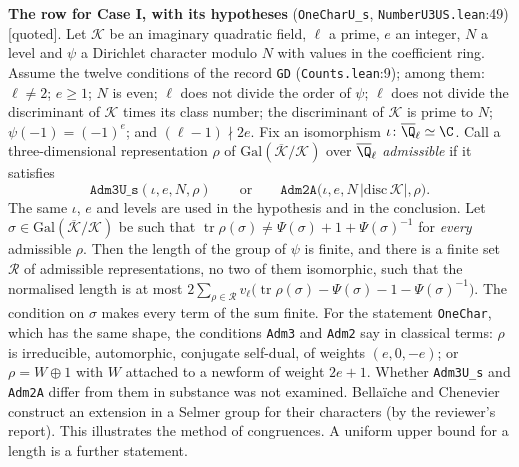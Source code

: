 \documentclass[11pt,letterpaper]{article}
\newcommand{\quoted}{\textsf{[quoted]}}
\begin{document}
\textbf{The row for Case I, with its hypotheses} (\texttt{OneCharU\_s}, \texttt{NumberU3US.lean}:49) \quoted. Let $\mathcal K$ be an
imaginary quadratic field, $\ell$ a prime, $e$ an integer, $N$ a level and $\psi$ a Dirichlet character
modulo $N$ with values in the coefficient ring. Assume the twelve conditions of the record \texttt{GD}
(\texttt{Counts.lean}:9); among them: $\ell\ne2$; $e\ge1$; $N$ is even; $\ell$ does not divide the order of
$\psi$; $\ell$ does not divide the discriminant of $\mathcal K$ times its class number; the discriminant of
$\mathcal K$ is prime to $N$; $\psi(-1)=(-1)^e$; and $(\ell-1)\nmid2e$. Fix an isomorphism
$\iota\colon\overline{\Q}_\ell\simeq\C$. Call a three-dimensional
representation $\rho$ of $\mathrm{Gal}(\overline{\mathcal K}/\mathcal K)$ over $\overline{\Q}_\ell$
\emph{admissible} if it satisfies
\begin{equation}\label{D:339}
 \texttt{Adm3U\_s}(\iota,e,N,\rho)\qquad\text{or}\qquad\texttt{Adm2A}\big(\iota,e,N\,|\mathrm{disc}\,\mathcal K|,\rho\big).
\end{equation}
The same $\iota$, $e$ and levels are used in the hypothesis and in the conclusion. Let
$\sigma\in\mathrm{Gal}(\overline{\mathcal K}/\mathcal K)$ be such that
$\operatorname{tr}\rho(\sigma)\ne\Psi(\sigma)+1+\Psi(\sigma)^{-1}$ for \emph{every} admissible $\rho$. Then
the length of the group of $\psi$ is finite, and there is a finite set $\mathcal R$ of admissible
representations, no two of them isomorphic, such that the normalised length is at most
$2\sum_{\rho\in\mathcal R}v_\ell\big(\operatorname{tr}\rho(\sigma)-\Psi(\sigma)-1-\Psi(\sigma)^{-1}\big)$.
The condition on $\sigma$ makes every term of the sum finite. For the statement \texttt{OneChar}, which
has the same shape, the conditions \texttt{Adm3} and \texttt{Adm2} say in classical terms: $\rho$ is
irreducible, automorphic, conjugate self-dual, of weights $(e,0,-e)$; or $\rho=W\oplus1$ with $W$ attached to
a newform of weight $2e+1$. Whether \texttt{Adm3U\_s} and \texttt{Adm2A} differ from them in substance was
not examined. Bella\"iche and Chenevier \cite[Thm.~1.1]{BC04} construct an extension in a Selmer group for
their characters (by the reviewer's report). This illustrates the method of congruences. A uniform upper bound for a length is a
further statement.
\end{document}
